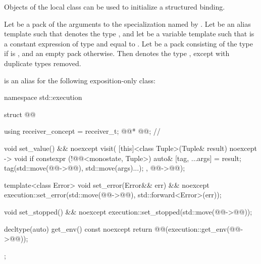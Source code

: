 \pnum
Objects of the local class  can be used
to initialize a structured binding.

\pnum
Let  be
a pack of the arguments to the  specialization
named by .
Let  be an alias template such that
 denotes
the type , and
let  be a variable template such that
 is
a constant expression of type  and
equal to .
Let  be a pack consisting of
the type 
if  is ,
and an empty pack otherwise.
Then  denotes
the type ,
except with duplicate types removed.

\pnum
{} is an alias for the following exposition-only class:
\begin{codeblock}
namespace std::execution {
  struct @@ {
    using receiver_concept = receiver_t;
    @@* @@;          // \expos

    void set_value() && noexcept {
      visit(
        [this]<class Tuple>(Tuple& result) noexcept -> void {
          if constexpr (!@@<monostate, Tuple>) {
            auto& [tag, ...args] = result;
            tag(std::move(@@->@@), std::move(args)...);
          }
        },
        @@->@@);
    }

    template<class Error>
    void set_error(Error&& err) && noexcept {
      execution::set_error(std::move(@@->@@), std::forward<Error>(err));
    }

    void set_stopped() && noexcept {
      execution::set_stopped(std::move(@@->@@));
    }

    decltype(auto) get_env() const noexcept {
      return @@(execution::get_env(@@->@@));
    }
  };
}
\end{codeblock}

